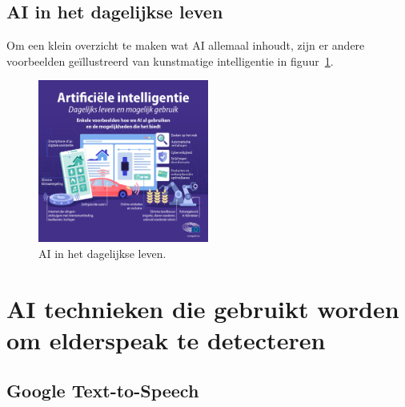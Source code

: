 \subsection{AI in het dagelijkse leven}
Om een klein overzicht te maken wat AI allemaal inhoudt, zijn er andere voorbeelden geïllustreerd van kunstmatige intelligentie in figuur~\ref{fig:ai_dagelijkse_leven}.
\begin{figure}
    \centering
    \includegraphics[width=0.5\textwidth]{./img/ai_voorbeelden.jpg}
    \caption{\label{fig:ai_dagelijkse_leven} AI in het dagelijkse leven.~\autocite{EuropeesParlement2020}}
\end{figure}

\section{AI technieken die gebruikt worden om elderspeak te detecteren}
\subsection{Google Text-to-Speech}